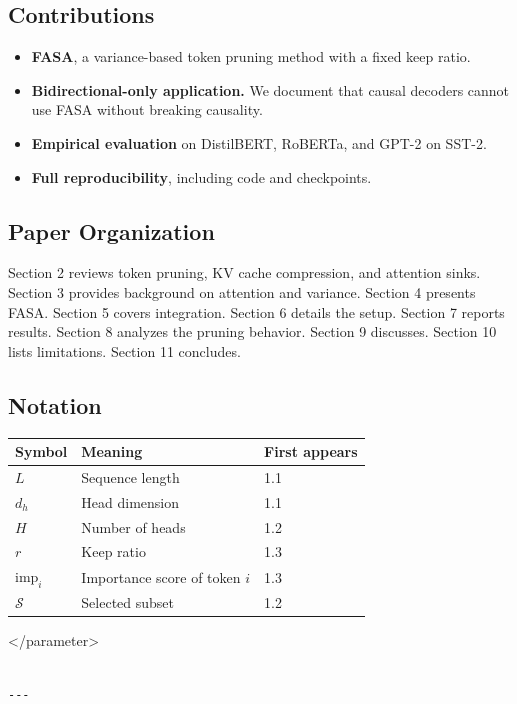 \subsection{Contributions}

\begin{itemize}
\item \textbf{FASA}, a variance-based token pruning method with a fixed keep ratio.
\item \textbf{Bidirectional-only application.} We document that causal decoders
  cannot use FASA without breaking causality.
\item \textbf{Empirical evaluation} on DistilBERT, RoBERTa, and GPT-2 on SST-2.
\item \textbf{Full reproducibility}, including code and checkpoints.

\end{itemize}
\subsection{Paper Organization}

Section 2 reviews token pruning, KV cache compression, and attention sinks. 
Section 3 provides background on attention and variance. Section 4 presents 
FASA. Section 5 covers integration. Section 6 details the setup. Section 7 
reports results. Section 8 analyzes the pruning behavior. Section 9 
discusses. Section 10 lists limitations. Section 11 concludes.



\subsection{Notation}

\begin{table}[H]
\centering
\small
\begin{tabular}{lll}
\toprule
\textbf{Symbol} & \textbf{Meaning} & \textbf{First appears} \\
\midrule
$L$ & Sequence length & 1.1 \\
$d_h$ & Head dimension & 1.1 \\
$H$ & Number of heads & 1.2 \\
$r$ & Keep ratio & 1.3 \\
$\text{imp}_i$ & Importance score of token $i$ & 1.3 \\
$\mathcal{S}$ & Selected subset & 1.2 \\
\bottomrule
\end{tabular}
\end{table}
\textless{}/parameter\textgreater{}
\begin{lstlisting}

---
\end{lstlisting}